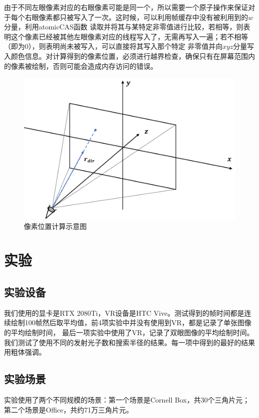 \documentclass[UTF8]{ctexart}
\begin{document}
        由于不同左眼像素对应的右眼像素可能是同一个，所以需要一个原子操作来保证对于每个右眼像素都只被写入了一次。这时候，可以利用帧缓存中没有被利用到的$w$分量，利用atomicCAS函数
        读取并将其与某特定非零值进行比较，若相等，则表明这个像素已经被其他左眼像素对应的线程写入了，无需再写入一遍；若不相等（即为0），则表明尚未被写入，可以直接将其写入那个特定
        非零值并向$xyz$分量写入颜色信息。对计算得到的像素位置，必须进行越界检查，确保只有在屏幕范围内的像素被绘制，否则可能会造成内存访问的错误。
        
        \begin{figure}[H]
        \centering
        \includegraphics[scale=0.6]{pic/IndexCalculation.png}
        \caption{像素位置计算示意图}
        \label{fig:4}
        \end{figure}
\section{实验}
    \subsection{实验设备}
        我们使用的显卡是RTX 2080Ti，VR设备是HTC Vive。测试得到的帧时间都是连续绘制100帧然后取平均值，前4项实验中并没有使用到VR，都是记录了单张图像的平均绘制时间，
        最后一项实验中使用了VR，记录了双眼图像的平均绘制时间。我们测试了使用不同的发射光子数和搜索半径的结果。每一项中得到的最好的结果用粗体强调。
    \subsection{实验场景}
        实验使用了两个不同规模的场景：第一个场景是Cornell Box，共30个三角片元；第二个场景是Office，共约71万三角片元。
\end{document}
